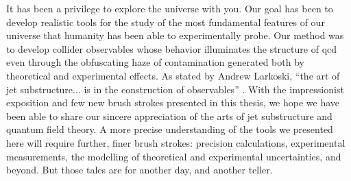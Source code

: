 It has been a privilege to explore the universe with you.
%
Our goal has been to develop realistic tools for the study of the most fundamental features of our universe that humanity has been able to experimentally probe.
%
Our method was to develop collider observables whose behavior illuminates the structure of \gls{qcd} even through the obfuscating haze of contamination generated both by theoretical and experimental effects.
%
As stated by Andrew Larkoski, ``the art of jet substructure... is in the construction of observables'' \cite{}.
%
With the impressionist exposition and few new brush strokes presented in this thesis, we hope we have been able to share our sincere appreciation of the arts of jet substructure and quantum field theory.
%
A more precise understanding of the tools we presented here will require further, finer brush strokes:
%
precision calculations, experimental measurements, the modelling of theoretical and experimental uncertainties, and beyond.
%
But those tales are for another day, and another teller.
